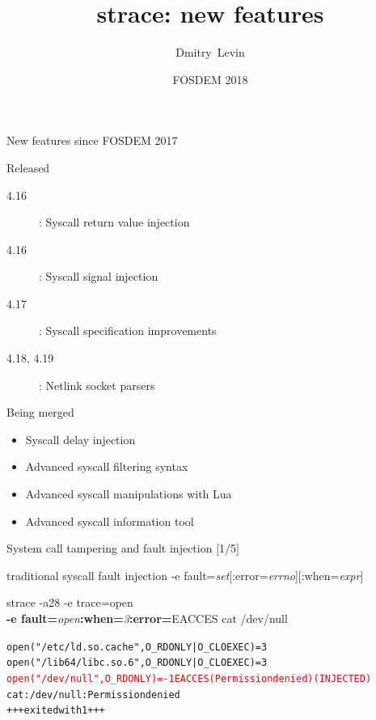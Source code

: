 \documentclass[unicode]{beamer}
\title{\Huge strace: new features}
\author{\Huge Dmitry~Levin}
\institute[BaseALT]{\Large BaseALT}
\date{FOSDEM 2018}
\begin{document}
\begin{frame}
\titlepage
\end{frame}

\begin{frame}{New features since FOSDEM 2017}
\begin{block}{\large Released}
\begin{description}
	\item[4.16]: Syscall return value injection
	\item[4.16]: Syscall signal injection
	\item[4.17]: Syscall specification improvements
	\item[4.18, 4.19]: Netlink socket parsers
\end{description}
\end{block}
\begin{block}{\large Being merged}
\begin{itemize}
	\item Syscall delay injection
	\item Advanced syscall filtering syntax
	\item Advanced syscall manipulations with Lua
	\item Advanced syscall information tool
\end{itemize}
\end{block}
\end{frame}

\begin{frame}[fragile]{System call tampering and fault injection \hfill [1/5]}
\begin{block}{\large traditional syscall fault injection}
-e fault=\textit{set}[:error=\textit{errno}][:when=\textit{expr}]
\end{block}
\begin{block}{\large strace -a28 -e trace=open \\ {\bf -e fault=}{\it open}{\bf :when=}{\it 3}{\bf :error=}{\sc EACCES} cat /dev/null}
\begin{alltt}
open("/etc/ld.so.cache", O_RDONLY|O_CLOEXEC) = 3
open("/lib64/libc.so.6", O_RDONLY|O_CLOEXEC) = 3
\textcolor{red}{open("/dev/null", O_RDONLY) = -1 EACCES (Permission denied) (INJECTED)}
cat: /dev/null: Permission denied
+++ exited with 1 +++
\end{alltt}
\end{block}
\end{frame}
\end{document}
